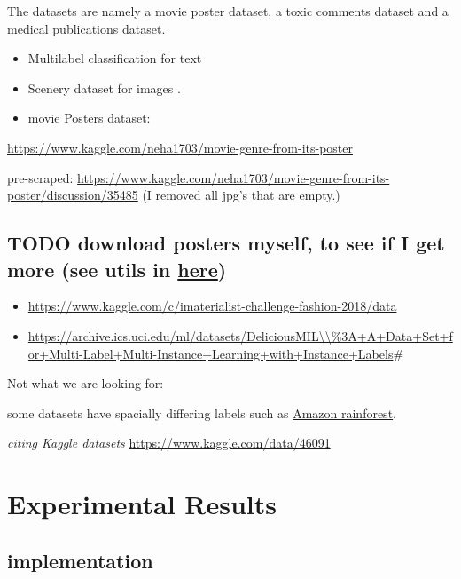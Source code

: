 \documentclass[sigconf,natbib,screen=true,review=true,anonymous]{acmart}
\begin{document}
The datasets are namely a movie poster dataset, a toxic comments dataset and a medical publications dataset.


\begin{itemize}
\item Multilabel classification for text \cite{toxicComments}

\item Scenery dataset for images \cite{dataScenery}.

\item movie Posters dataset:
\end{itemize}

\url{https://www.kaggle.com/neha1703/movie-genre-from-its-poster}

pre-scraped: \url{https://www.kaggle.com/neha1703/movie-genre-from-its-poster/discussion/35485} (I removed all jpg's that are empty.)

\subsection*{{\color{red}\bfseries\sffamily TODO} download posters myself, to see if I get more  (see utils in \href{https://github.com/ashrefm/multi-label-soft-f1.git}{here})}
\label{sec:org57b158a}
\begin{itemize}
\item \url{https://www.kaggle.com/c/imaterialist-challenge-fashion-2018/data}

\item \url{https://archive.ics.uci.edu/ml/datasets/DeliciousMIL\\\%3A+A+Data+Set+for+Multi-Label+Multi-Instance+Learning+with+Instance+Labels}\#
\end{itemize}


Not what we are looking for:

some datasets have spacially differing labels such as \href{https://machinelearningmastery.com/how-to-develop-a-convolutional-neural-network-to-classify-satellite-photos-of-the-amazon-rainforest/}{Amazon rainforest}.

\emph{citing Kaggle datasets}
\url{https://www.kaggle.com/data/46091}

\section{Experimental Results}
\label{sec:org2fcc5d2}


\subsection{implementation}
\label{sec:org567c4e3}
\end{document}
